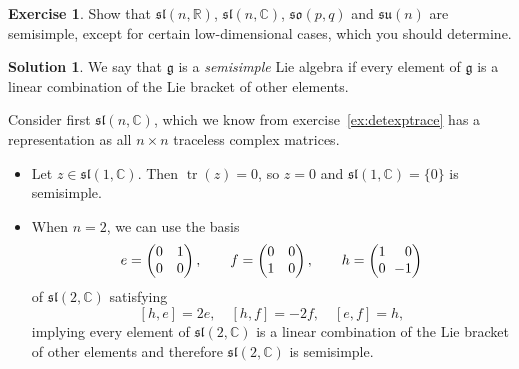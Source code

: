 \documentclass[11pt, a4paper]{report}
\theoremstyle{definition}
\newtheorem{exercise}{Exercise}[part]
\newtheorem{solution}{Solution}[part]
\newenvironment{ex}{\begin{exercise}}{\end{exercise}\pagebreak[1]}
\newenvironment{sol}{\begin{solution}}{\end{solution}\pagebreak[3]}
\newcommand*{\m}{\ensuremath\:\, \mathllap{-}}
\DeclareMathOperator{\tr}{tr}
\begin{document}
\begin{ex}

Show that $\mathfrak{sl}(n, \mathbb{R})$, $\mathfrak{sl}(n, \mathbb{C})$, $\mathfrak{so}(p, q)$ and $\mathfrak{su}(n)$ are semisimple, except for certain low-dimensional cases, which you should determine.

\end{ex}

\begin{sol}

We say that $\mathfrak{g}$ is a \emph{semisimple} Lie algebra if every element of $\mathfrak{g}$ is a linear combination of the Lie bracket of other elements.


Consider first $\mathfrak{sl}(n, \mathbb{C})$, which we know from exercise~\ref{ex:detexptrace} has a representation as all $n \times n$ traceless complex matrices.

\begin{itemize}

    \item Let $z \in \mathfrak{sl}(1, \mathbb{C})$.
    Then $\tr(z) = 0$, so $z = 0$ and $\mathfrak{sl}(1, \mathbb{C}) = \{0\}$ is semisimple.

    \item When $n = 2$, we can use the basis
    \[
        e = \begin{pmatrix}
                0 & 1 \\
                0 & 0
            \end{pmatrix}, \qquad
        f = \begin{pmatrix}
                0 & 0 \\
                1 & 0
            \end{pmatrix}, \qquad
        h = \begin{pmatrix*}[r]
                1 & 0 \\
                0 & \m 1
            \end{pmatrix*}
    \]
    of $\mathfrak{sl}(2, \mathbb{C})$ satisfying
    \[
        [h, e] = 2e, \quad
        [h, f] = -2f, \quad
        [e, f] = h,
    \]
    implying every element of $\mathfrak{sl}(2, \mathbb{C})$ is a linear combination of the Lie bracket of other elements and therefore $\mathfrak{sl}(2, \mathbb{C})$ is semisimple.


\end{itemize}
\end{sol}
\end{document}
